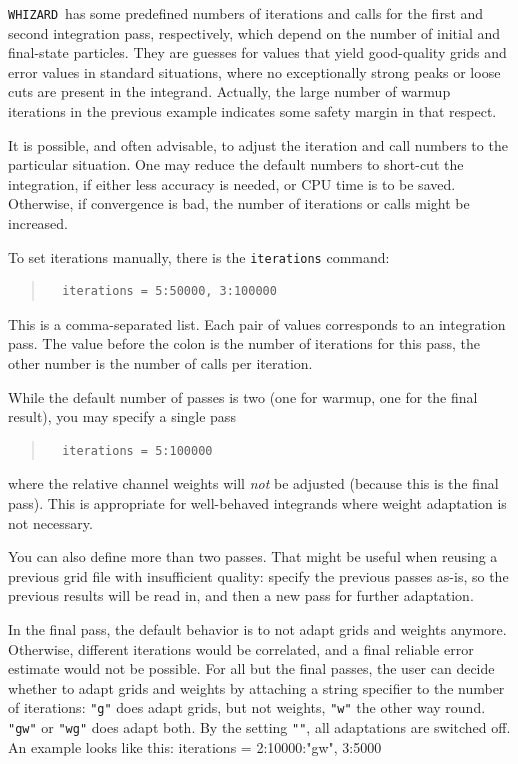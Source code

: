 \documentclass[12pt]{book}
\newenvironment{code}%
  {\begingroup\footnotesize
   \quote
   \Verbatim}%
  {\endVerbatim
   \endquote
   \endgroup\noindent}
\newcommand{\ttt}[1]{\texttt{#1}}
\newcommand{\whizard}{\ttt{WHIZARD}}
\begin{document}
\whizard\ has some predefined numbers of iterations and calls for the first
and second integration pass, respectively, which depend on the number of
initial and final-state particles.  They are guesses for values that yield
good-quality grids and error values in standard situations, where no
exceptionally strong peaks or loose cuts are present in the integrand.
Actually, the large number of warmup iterations in the previous example
indicates some safety margin in that respect.

It is possible, and often advisable, to adjust the iteration and call numbers
to the particular situation.  One may reduce the default numbers to short-cut
the integration, if either less accuracy is needed, or CPU time is to be
saved.  Otherwise, if convergence is bad, the number of iterations or calls
might be increased.

To set iterations manually, there is the \ttt{iterations} command:
\begin{quote}
\begin{footnotesize}
\begin{verbatim}
  iterations = 5:50000, 3:100000
\end{verbatim}
\end{footnotesize}
\end{quote}
This is a comma-separated list.  Each pair of values corresponds to an
integration pass.  The value before the colon is the number of iterations for
this pass, the other number is the number of calls per iteration.

While the default number of passes is two (one for warmup, one for the final
result), you may specify a single pass
\begin{quote}
\begin{footnotesize}
\begin{verbatim}
  iterations = 5:100000
\end{verbatim}
\end{footnotesize}
\end{quote}
where the relative channel weights will \emph{not} be adjusted (because this
is the final pass).  This is appropriate for well-behaved integrands where
weight adaptation is not necessary.

You can also define more than two passes.  That might be useful when reusing a
previous grid file with insufficient quality: specify the previous passes
as-is, so the previous results will be read in, and then a new pass for
further adaptation.

In the final pass, the default behavior is to not adapt grids and
weights anymore. Otherwise, different iterations would be correlated,
and a final reliable error estimate would not be possible. For all but
the final passes, the user can decide whether to adapt grids and
weights by attaching a string specifier to the number of iterations:
\ttt{"g"} does adapt grids, but not weights, \ttt{"w"} the other way
round. \ttt{"gw"} or \ttt{"wg"} does adapt both. By the setting
\ttt{""}, all adaptations are switched off. An example looks like
this:
\begin{code}
  iterations = 2:10000:"gw", 3:5000
\end{code}
\end{document}
